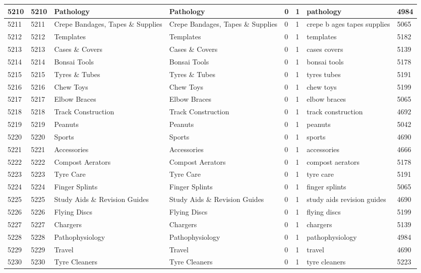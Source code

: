 \begin{longtable}{|l|l|l|l|l|l|l|l|}
5210 & 5210 & Pathology & Pathology & 0 & 1 & pathology & 4984 \\ \hline 
5211 & 5211 & Crepe Bandages, Tapes \& Supplies & Crepe Bandages, Tapes \& Supplies & 0 & 1 & crepe b ages tapes supplies & 5065 \\ \hline 
5212 & 5212 & Templates & Templates & 0 & 1 & templates & 5182 \\ \hline 
5213 & 5213 & Cases \& Covers & Cases \& Covers & 0 & 1 & cases covers & 5139 \\ \hline 
5214 & 5214 & Bonsai Tools & Bonsai Tools & 0 & 1 & bonsai tools & 5178 \\ \hline 
5215 & 5215 & Tyres \& Tubes & Tyres \& Tubes & 0 & 1 & tyres tubes & 5191 \\ \hline 
5216 & 5216 & Chew Toys & Chew Toys & 0 & 1 & chew toys & 5199 \\ \hline 
5217 & 5217 & Elbow Braces & Elbow Braces & 0 & 1 & elbow braces & 5065 \\ \hline 
5218 & 5218 & Track Construction & Track Construction & 0 & 1 & track construction & 4692 \\ \hline 
5219 & 5219 & Peanuts & Peanuts & 0 & 1 & peanuts & 5042 \\ \hline 
5220 & 5220 & Sports & Sports & 0 & 1 & sports & 4690 \\ \hline 
5221 & 5221 & Accessories & Accessories & 0 & 1 & accessories & 4666 \\ \hline 
5222 & 5222 & Compost Aerators & Compost Aerators & 0 & 1 & compost aerators & 5178 \\ \hline 
5223 & 5223 & Tyre Care & Tyre Care & 0 & 1 & tyre care & 5191 \\ \hline 
5224 & 5224 & Finger Splints & Finger Splints & 0 & 1 & finger splints & 5065 \\ \hline 
5225 & 5225 & Study Aids \& Revision Guides & Study Aids \& Revision Guides & 0 & 1 & study aids revision guides & 4690 \\ \hline 
5226 & 5226 & Flying Discs & Flying Discs & 0 & 1 & flying discs & 5199 \\ \hline 
5227 & 5227 & Chargers & Chargers & 0 & 1 & chargers & 5139 \\ \hline 
5228 & 5228 & Pathophysiology & Pathophysiology & 0 & 1 & pathophysiology & 4984 \\ \hline 
5229 & 5229 & Travel & Travel & 0 & 1 & travel & 4690 \\ \hline 
5230 & 5230 & Tyre Cleaners & Tyre Cleaners & 0 & 1 & tyre cleaners & 5223 \\ \hline 

\end{longtable}
